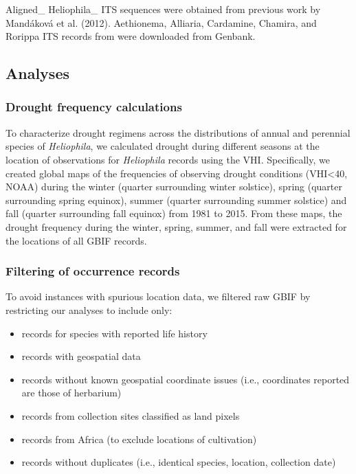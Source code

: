 \documentclass[man,floatsintext]{apa6}
\providecommand{\tightlist}{%
  \setlength{\itemsep}{0pt}\setlength{\parskip}{0pt}}
\theoremstyle{definition}
\theoremstyle{definition}
\theoremstyle{definition}
\theoremstyle{remark}
\begin{document}
Aligned\_ Heliophila\_ ITS sequences were obtained from previous work by
Mandáková et al. (2012). Aethionema, Alliaria, Cardamine, Chamira, and
Rorippa ITS records from were downloaded from Genbank.

\hypertarget{analyses}{%
\subsection{Analyses}\label{analyses}}

\hypertarget{drought-frequency-calculations}{%
\subsubsection{Drought frequency
calculations}\label{drought-frequency-calculations}}

To characterize drought regimens across the distributions of annual and
perennial species of \emph{Heliophila}, we calculated drought during
different seasons at the location of observations for \emph{Heliophila}
records using the VHI. Specifically, we created global maps of the
frequencies of observing drought conditions (VHI\textless{}40, NOAA)
during the winter (quarter surrounding winter solstice), spring (quarter
surrounding spring equinox), summer (quarter surrounding summer
solstice) and fall (quarter surrounding fall equinox) from 1981 to 2015.
From these maps, the drought frequency during the winter, spring,
summer, and fall were extracted for the locations of all GBIF records.

\hypertarget{filtering-of-occurrence-records}{%
\subsubsection{Filtering of occurrence
records}\label{filtering-of-occurrence-records}}

To avoid instances with spurious location data, we filtered raw GBIF by
restricting our analyses to include only:

\begin{itemize}
\tightlist
\item
  records for species with reported life history\\
\item
  records with geospatial data\\
\item
  records without known geospatial coordinate issues (i.e., coordinates
  reported are those of herbarium)\\
\item
  records from collection sites classified as land pixels\\
\item
  records from Africa (to exclude locations of cultivation)
\item
  records without duplicates (i.e., identical species, location,
  collection date)
\end{itemize}
\end{document}
